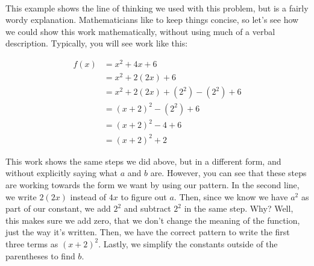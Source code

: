 \\

This example shows the line of thinking we used with this problem, but is a fairly wordy explanation. Mathematicians like to keep things concise, so let's see how we could show this work mathematically, without using much of a verbal description. Typically, you will see work like this:

\begin{equation}
	\begin{split}
		f(x) & = x^2 + 4x + 6 \\
		     & = x^2 + 2(2x) +6 \\
		     & = x^2 + 2(2x)+ (2^2) - (2^2) + 6 \\
		     & = (x+2)^2 -(2^2) + 6 \\
		     & = (x+2)^2 -4 + 6 \\
		     & = (x+2)^2 +2
	\end{split}
\end{equation}

\noindent
This work shows the same steps we did above, but in a different form, and without explicitly saying what $a$ and $b$ are. However, you can see that these steps are working towards the form we want by using our pattern. In the second line, we write $2(2x)$ instead of $4x$ to figure out $a$. Then, since we know we have $a^2$ as part of our constant, we add $2^2$ and subtract $2^2$ in the same step. Why? Well, this makes sure we add zero, that we don't change the meaning of the function, just the way it's written. Then, we have the correct pattern to write the first three terms as $(x+2)^2$. Lastly, we simplify the constants outside of the parentheses to find $b$.

